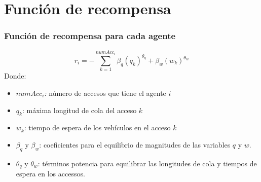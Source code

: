 \documentclass[11pt]{beamer}
\begin{document}
\section{Función de recompensa}
\begin{frame}
\frametitle{Función de recompensa para cada agente}
\begin{equation*}\label{eq:rewardQ}
r_i=-\sum_{k=1}^{numAcc_i}\beta_q(q_k)^{\theta_q} + \beta_w(w_k)^{\theta_w}
\end{equation*}
Donde:
\begin{itemize}
\item \textit{$numAcc_i$: } número de accesos que tiene el agente $i$
\item $q_k$: máxima longitud de cola del acceso $k$
\item $w_k$: tiempo de espera de los vehículos en el acceso $k$
\item $\beta_q$ y $\beta_w$: coeficientes para el equilibrio de magnitudes de las variables $q$ y $w$.
\item $\theta_q$ y $\theta_w$: términos potencia para equilibrar las longitudes de cola y tiempos de espera en los accessos.
\end{itemize}
\end{frame}
\end{document}
